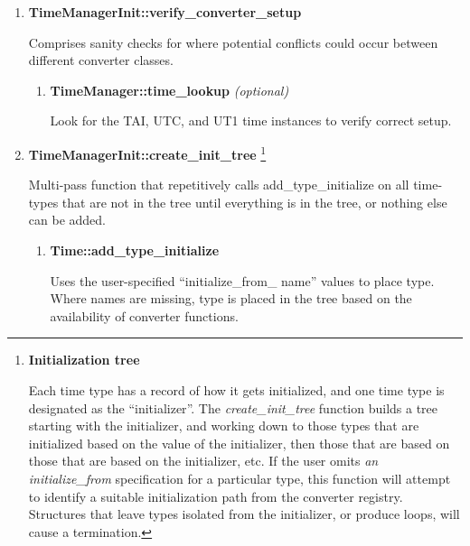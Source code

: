 {\begin{enumerate}
{\begin{enumerate}
{\begin{enumerate}
Stores +1 / 0 / -1 in each location of the direction tables (+1
represents a-to-b, 0 indicates that the converter may not be used, -1
represents b-to-a).

\end{enumerate}}  %

\item \textbf{TimeManagerInit::verify\_converter\_setup} \par

Comprises sanity checks for where potential conflicts could occur between
different converter classes.

{\begin{enumerate}  %
\item \textbf{TimeManager::time\_lookup
}\textit{(optional)} \par
Look for the TAI, UTC, and UT1 time instances to verify correct setup.

\end{enumerate}}  %

\clearpage

\item \textbf{TimeManagerInit::create\_init\_tree}
{\footnote{{\bf Initialization tree}\par 
Each time type has a record of how it gets initialized,
and one time type is designated as the
{\textquotedblleft}initializer{\textquotedblright}.  The
\textit{create\_init\_tree} function builds a tree starting with the
initializer, and working down to those types that are initialized based
on the value of the initializer, then those that are based on those
that are based on the initializer, etc.  If the user omits \textit{an
initialize\_from }specification for a particular type, this function
will attempt to identify a suitable initialization path from the
converter registry.  Structures that leave types isolated from the
initializer, or produce loops, will cause a termination.}} \par

Multi-pass function that repetitively calls
add\_type\_initialize on all time-types that are not in the tree until
everything is in the tree, or nothing else can be added.

{\begin{enumerate}   %
\item \textbf{Time::add\_type\_initialize}\par
Uses the user-specified {\textquotedblleft}initialize\_from\_
name{\textquotedblright} values to place type. Where names are missing,
type is placed in the tree based on the availability of converter
functions.


\end{enumerate}}
\end{enumerate}}
\end{enumerate}}
